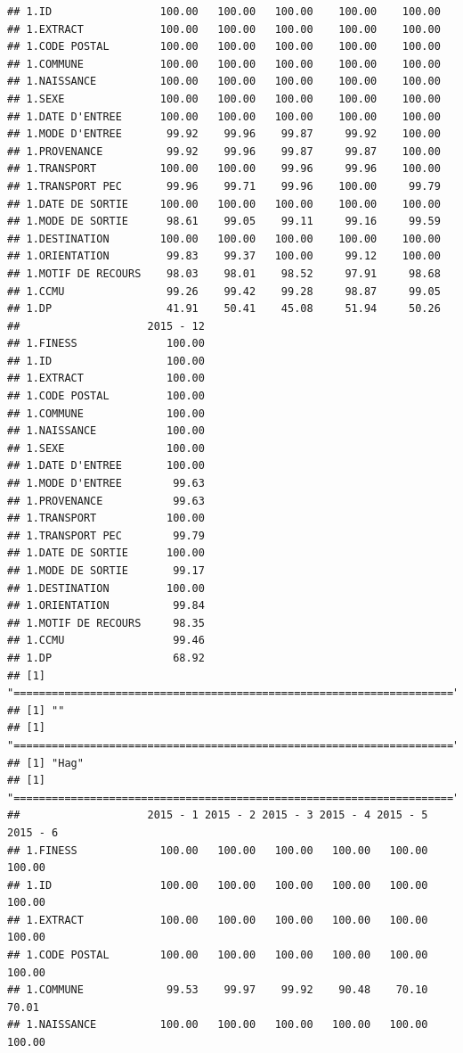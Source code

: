 \documentclass[]{article}
\begin{document}
\begin{verbatim}
## 1.ID                 100.00   100.00   100.00    100.00    100.00
## 1.EXTRACT            100.00   100.00   100.00    100.00    100.00
## 1.CODE POSTAL        100.00   100.00   100.00    100.00    100.00
## 1.COMMUNE            100.00   100.00   100.00    100.00    100.00
## 1.NAISSANCE          100.00   100.00   100.00    100.00    100.00
## 1.SEXE               100.00   100.00   100.00    100.00    100.00
## 1.DATE D'ENTREE      100.00   100.00   100.00    100.00    100.00
## 1.MODE D'ENTREE       99.92    99.96    99.87     99.92    100.00
## 1.PROVENANCE          99.92    99.96    99.87     99.87    100.00
## 1.TRANSPORT          100.00   100.00    99.96     99.96    100.00
## 1.TRANSPORT PEC       99.96    99.71    99.96    100.00     99.79
## 1.DATE DE SORTIE     100.00   100.00   100.00    100.00    100.00
## 1.MODE DE SORTIE      98.61    99.05    99.11     99.16     99.59
## 1.DESTINATION        100.00   100.00   100.00    100.00    100.00
## 1.ORIENTATION         99.83    99.37   100.00     99.12    100.00
## 1.MOTIF DE RECOURS    98.03    98.01    98.52     97.91     98.68
## 1.CCMU                99.26    99.42    99.28     98.87     99.05
## 1.DP                  41.91    50.41    45.08     51.94     50.26
##                    2015 - 12
## 1.FINESS              100.00
## 1.ID                  100.00
## 1.EXTRACT             100.00
## 1.CODE POSTAL         100.00
## 1.COMMUNE             100.00
## 1.NAISSANCE           100.00
## 1.SEXE                100.00
## 1.DATE D'ENTREE       100.00
## 1.MODE D'ENTREE        99.63
## 1.PROVENANCE           99.63
## 1.TRANSPORT           100.00
## 1.TRANSPORT PEC        99.79
## 1.DATE DE SORTIE      100.00
## 1.MODE DE SORTIE       99.17
## 1.DESTINATION         100.00
## 1.ORIENTATION          99.84
## 1.MOTIF DE RECOURS     98.35
## 1.CCMU                 99.46
## 1.DP                   68.92
## [1] "====================================================================="
## [1] ""
## [1] "====================================================================="
## [1] "Hag"
## [1] "====================================================================="
##                    2015 - 1 2015 - 2 2015 - 3 2015 - 4 2015 - 5 2015 - 6
## 1.FINESS             100.00   100.00   100.00   100.00   100.00   100.00
## 1.ID                 100.00   100.00   100.00   100.00   100.00   100.00
## 1.EXTRACT            100.00   100.00   100.00   100.00   100.00   100.00
## 1.CODE POSTAL        100.00   100.00   100.00   100.00   100.00   100.00
## 1.COMMUNE             99.53    99.97    99.92    90.48    70.10    70.01
## 1.NAISSANCE          100.00   100.00   100.00   100.00   100.00   100.00

\end{verbatim}
\end{document}
